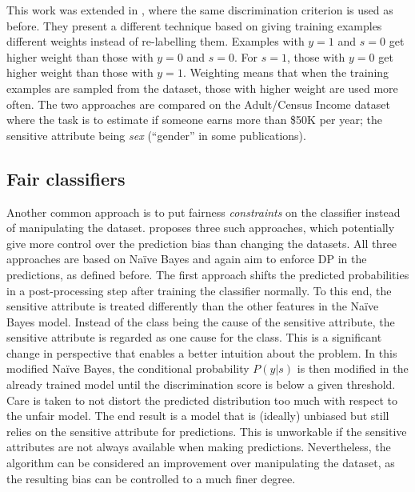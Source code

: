 This work was extended in \citet{calders2009building}, where the same discrimination criterion is
used as before. They present a different technique based on giving training examples different
weights instead of re-labelling them. Examples with \(y=1\) and \(s=0\) get higher weight than
those with \(y=0\) and \(s=0\). For \(s=1\), those with \(y=0\) get higher weight than those with
\(y=1\). Weighting means that when the training examples are sampled from the dataset, those with
higher weight are used more often. The two approaches are compared on the Adult/Census Income
dataset \citep{kohavi1996scaling} where the task is to estimate if someone earns more than \$50K
per year; the sensitive attribute being \emph{sex} (``gender'' in some publications).

\subsection{Fair classifiers}\label{fair-classifiers} Another common approach is to put fairness
\emph{constraints} on the classifier instead of manipulating the dataset. \citet{calders2010three}
proposes three such approaches, which potentially give more control over the prediction bias than
changing the datasets. All three approaches are based on Na\"ive Bayes and again aim to enforce
\ac{DP} in the predictions, as defined before. The first approach shifts the predicted
probabilities in a post-processing step after training the classifier normally. To this end, the
sensitive attribute is treated differently than the other features in the Na\"ive Bayes model.
Instead of the class being the cause of the sensitive attribute, the sensitive attribute is
regarded as one cause for the class. This is a significant change in perspective that enables a
better intuition about the problem. In this modified Na\"ive Bayes, the conditional probability
\(P(y|s)\) is then modified in the already trained model until the discrimination score is below a
given threshold. Care is taken to not distort the predicted distribution too much with respect to
the unfair model. The end result is a model that is (ideally) unbiased but still relies on the
sensitive attribute for predictions. This is unworkable if the sensitive attributes are not always
available when making predictions. Nevertheless, the algorithm can be considered an improvement
over manipulating the dataset, as the resulting bias can be controlled to a much finer degree.

